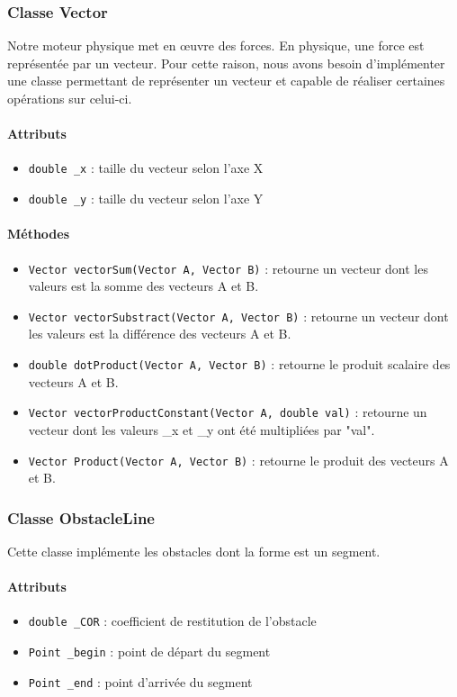 \documentclass{report}
\begin{document}
\subsubsection{Classe Vector}

Notre moteur physique met en œuvre des forces. En physique, une force est représentée par un vecteur. Pour cette raison, nous avons besoin d'implémenter une classe permettant de représenter un vecteur et capable de réaliser certaines opérations sur celui-ci.

\paragraph*{Attributs}
\begin{itemize}
\item \texttt{double \_x} : taille du vecteur selon l'axe X
\item \texttt{double \_y} : taille du vecteur selon l'axe Y
\end{itemize}

\paragraph*{Méthodes}
\begin{itemize}
\item \texttt{Vector vectorSum(Vector A, Vector B)} : retourne un vecteur dont les valeurs est la somme des vecteurs A et B.
\item \texttt{Vector vectorSubstract(Vector A, Vector B)} : retourne un vecteur dont les valeurs est la différence des vecteurs A et B.
\item \texttt{double dotProduct(Vector A, Vector B)} : retourne le produit scalaire des vecteurs A et B.
\item \texttt{Vector vectorProductConstant(Vector A, double val)} : retourne un vecteur dont les valeurs  \_x et \_y ont été multipliées par "val".
\item \texttt{Vector Product(Vector A, Vector B)} : retourne le produit des vecteurs A et B.
\end{itemize}

\subsubsection{Classe ObstacleLine}

Cette classe implémente les obstacles dont la forme est un segment.

\paragraph*{Attributs}
\begin{itemize}
\item \texttt{double \_COR} : coefficient de restitution de l'obstacle 
\item \texttt{Point \_begin} : point de départ du segment
\item \texttt{Point \_end} : point d'arrivée du segment
\end{itemize}
\end{document}
